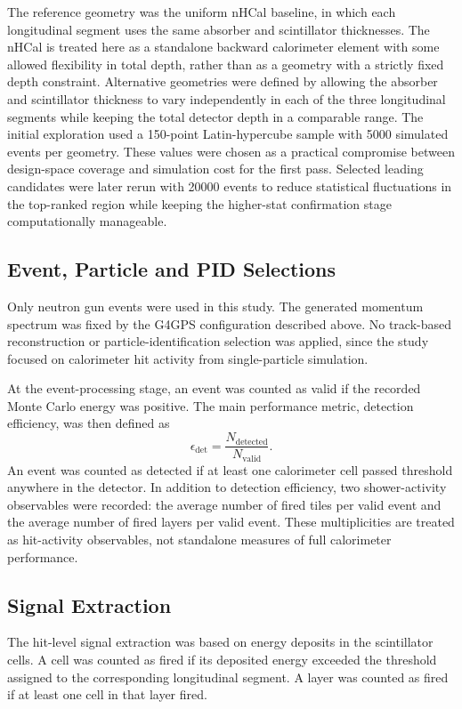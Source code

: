 \noindent The reference geometry was the uniform nHCal baseline, in which each longitudinal segment uses the same absorber and scintillator thicknesses. The nHCal is treated here as a standalone backward calorimeter element with some allowed flexibility in total depth, rather than as a geometry with a strictly fixed depth constraint. Alternative geometries
were defined by allowing the absorber and scintillator thickness to vary independently in each of the three longitudinal segments while keeping the total detector depth in a
comparable range. The initial exploration used a 150-point Latin-hypercube sample with 5000 simulated events per geometry. These values were chosen as a practical compromise
between design-space coverage and simulation cost for the first pass. Selected leading candidates were later rerun with 20000 events to reduce statistical fluctuations in the
top-ranked region while keeping the higher-stat confirmation stage computationally manageable.

\subsection{Event, Particle and PID Selections}

\noindent Only neutron gun events were used in this study. The generated momentum spectrum was fixed by the G4GPS configuration described above. No track-based reconstruction
or particle-identification selection was applied, since the study focused on calorimeter hit activity from single-particle simulation.

\noindent At the event-processing stage, an event was counted as valid if the recorded Monte Carlo energy was positive. The main performance metric, detection efficiency, was then defined as
\[
\epsilon_{\mathrm{det}}=\frac{N_{\mathrm{detected}}}{N_{\mathrm{valid}}}.
\]
An event was counted as detected if at least one calorimeter cell passed threshold anywhere in the detector. In addition to detection efficiency, two shower-activity observables
were recorded: the average number of fired tiles per valid event and the average number of fired layers per valid event. These multiplicities are treated as hit-activity observables, not standalone measures of full calorimeter performance.

\subsection{Signal Extraction}

\noindent The hit-level signal extraction was based on energy deposits in the scintillator cells. A cell was counted as fired if its deposited energy exceeded the threshold
assigned to the corresponding longitudinal segment. A layer was counted as fired if at least one cell in that layer fired.

